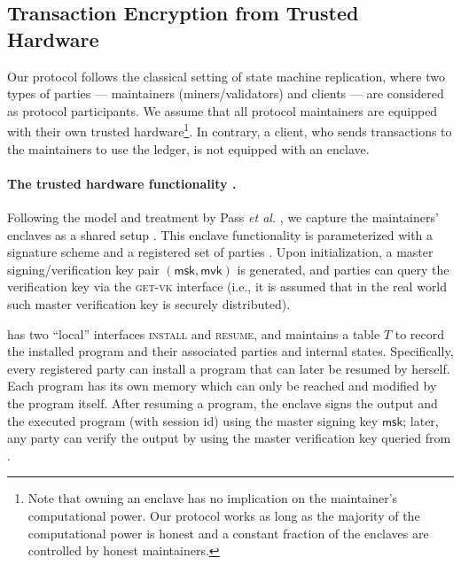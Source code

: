 \subsection{Transaction Encryption from Trusted Hardware}
\label{subsec:tx-encryption-trusted-hardware}

Our protocol follows the classical setting of state machine replication, where two types of parties --- maintainers (miners/validators) and clients --- are considered as protocol participants.
%
We assume that all protocol maintainers are equipped with their own trusted hardware\footnote{Note that owning an enclave has no implication on the maintainer's computational power. Our protocol works as long as the majority of the computational power is honest and a constant fraction of the enclaves are controlled by honest maintainers.}.
%
In contrary, a client, who sends transactions to the maintainers to use the ledger, is not equipped with an enclave.

\paragraph{The trusted hardware functionality \funcEnclave.}
%
Following the model and treatment by Pass \textit{et al.} \cite{EC:PasShiTra17}, we capture the maintainers' enclaves as a shared setup \funcEnclave.
%
This enclave functionality \funcEnclave is parameterized with a signature scheme \SIG and a registered set of parties \partyset.
%
Upon initialization, a master signing/verification key pair $(\mathsf{msk}, \mathsf{mvk})$ is generated, and parties can query the verification key via the \textsc{get-vk} interface (i.e., it is assumed that in the real world such master verification key is securely distributed).

\funcEnclave has two ``local'' interfaces \textsc{install} and \textsc{resume}, and maintains a table $T$ to record the installed program and their associated parties and internal states.
%
Specifically, every registered party can install a program that can later be resumed by herself.
%
Each program has its own memory which can only be reached and modified by the program itself.
%
After resuming a program, the enclave signs the output and the executed program (with session id) using the master signing key $\mathsf{msk}$; later, any party can verify the output by using the master verification key queried from \funcEnclave.



